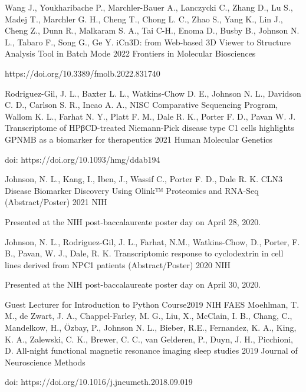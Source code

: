 \begin{cventries}
  \cventry
  {Wang J., Youkharibache P., Marchler-Bauer A., Lanczycki C., Zhang D., Lu S., Madej T., Marchler G. H., Cheng T., Chong L. C., Zhao S., Yang K., Lin J., Cheng Z., Dunn R., Malkaram S. A., Tai C-H., Enoma D., Busby B., Johnson N. L., Tabaro F., Song G., Ge Y.}%
  {iCn3D: from Web-based 3D Viewer to Structure Analysis Tool in Batch Mode} %
  {2022} %
  {Frontiers in Molecular Biosciences} %
  {
    \begin{cvitems} %
    \item {https://doi.org/10.3389/fmolb.2022.831740}
    \end{cvitems}
  }
  \cventry
  {Rodriguez-Gil, J. L., Baxter L. L., Watkins-Chow D. E., Johnson N. L., Davidson C. D., Carlson S. R., Incao A. A., NISC Comparative Sequencing Program, Wallom K. L., Farhat N. Y., Platt F. M., Dale R. K., Porter F. D., Pavan W. J.}%
  {Transcriptome of HPβCD-treated Niemann-Pick disease type C1 cells highlights GPNMB as a biomarker for therapeutics} %
  {2021} %
  {Human Molecular Genetics} %
  {
    \begin{cvitems} %
    \item {doi: https://doi.org/10.1093/hmg/ddab194}
    \end{cvitems}
  }
  \cventry
  {Johnson, N. L., Kang, I., Iben, J., Wassif C., Porter F. D., Dale R. K.}%
  {CLN3 Disease Biomarker Discovery Using Olink™ Proteomics and RNA-Seq
  (Abstract/Poster)} %
  {2021} %
  {NIH} %
  {
    \begin{cvitems} %
    \item {Presented at the NIH post-baccalaureate poster day on April 28, 2020.}
    \end{cvitems}
  }
  
  \cventry 
  {Johnson, N. L., Rodriguez-Gil, J. L., Farhat, N.M., Watkins-Chow, D., Porter, F. B., Pavan, W. J., Dale, R. K.} %
  {Transcriptomic response to cyclodextrin in cell lines derived from NPC1 patients (Abstract/Poster)} %
  {2020} %
  {NIH} %
  {
    \begin{cvitems} %
    \item {Presented at the NIH post-baccalaureate poster day on April 30, 2020.}
    \end{cvitems}
 }
  {Guest Lecturer for Introduction to Python Course}{2019}
  {NIH FAES}
  {}
  \cventry
  {Moehlman, T. M., de Zwart, J. A., Chappel-Farley, M. G., Liu, X., McClain, I. B., Chang, C., Mandelkow, H., Özbay, P., Johnson N. L., Bieber, R.E., Fernandez, K. A., King, K. A., Zalewski, C. K., Brewer, C. C., van Gelderen, P., Duyn, J. H., Picchioni, D.} %
  {All-night functional magnetic resonance imaging sleep studies} %
  {2019}%
  {Journal of Neuroscience Methods} %
  {
    \begin{cvitems} %
    \item {doi: https://doi.org/10.1016/j.jneumeth.2018.09.019}
    \end{cvitems}
  }
  

\end{cventries}
